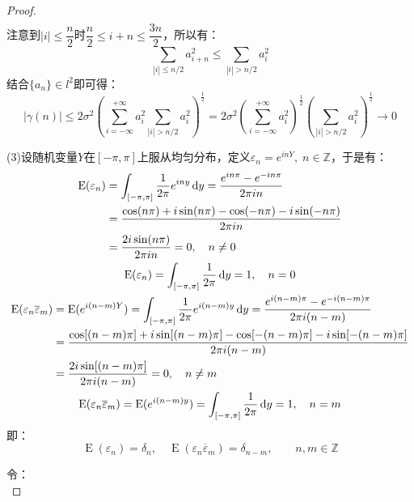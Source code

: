 \begin{proof}
\begin{align*}
	\end{align*}
	注意到$|i|\leqslant\dfrac{n}{2}$时$\dfrac{n}{2}\leqslant i+n\leqslant\dfrac{3n}{2}$，所以有：
	\begin{equation*}
		\sum_{|i|\leqslant n/2}a_{i+n}^2\leqslant\sum_{|i|>n/2}a_{i}^2
	\end{equation*}
	结合$\{a_n\}\in l^2$即可得：
	\begin{equation*}
		|\gamma(n)|\leqslant2\sigma^2\left(\sum_{i=-\infty}^{+\infty}a_i^2\sum_{|i|>n/2}a_{i}^2\right)^\frac{1}{2}=2\sigma^2\left(\sum_{i=-\infty}^{+\infty}a_i^2\right)^{\frac{1}{2}}\left(\sum_{|i|>n/2}a_{i}^2\right)^{\frac{1}{2}}\to0
	\end{equation*}\par
	(3)设随机变量$Y$在$[-\pi,\pi]$上服从均匀分布，定义$\varepsilon_n=e^{inY},\;n\in\mathbb{Z}$，于是有：
	\begin{gather*}
		\begin{aligned}
			\operatorname{E}(\varepsilon_n)&=\int_{[-\pi,\pi]}\frac{1}{2\pi}e^{iny}\mathop{}\!\mathrm{d} y=\frac{e^{in\pi}-e^{-in\pi}}{2\pi in} \\
			&=\frac{\cos(n\pi)+i\sin(n\pi)-\cos(-n\pi)-i\sin(-n\pi)}{2\pi in} \\
			&=\frac{2i\sin(n\pi)}{2\pi in}=0,\quad n\ne0
		\end{aligned} \\
		\operatorname{E}(\varepsilon_n)=\int_{[-\pi,\pi]}\frac{1}{2\pi}\mathop{}\!\mathrm{d} y=1,\quad n=0 \\
		\begin{aligned}
			\operatorname{E}(\varepsilon_n\overline{\varepsilon}_m)&=\operatorname{E}(e^{i(n-m)Y})=\int_{[-\pi,\pi]}\frac{1}{2\pi}e^{i(n-m)y}\mathop{}\!\mathrm{d} y=\frac{e^{i(n-m)\pi}-e^{-i(n-m)\pi}}{2\pi i(n-m)} \\
			&=\frac{\cos[(n-m)\pi]+i\sin[(n-m)\pi]-\cos[-(n-m)\pi]-i\sin[-(n-m)\pi]}{2\pi i(n-m)} \\
			&=\frac{2i\sin[(n-m)\pi]}{2\pi i(n-m)}=0,\quad n\ne m
		\end{aligned} \\
		\operatorname{E}(\varepsilon_n\overline{\varepsilon}_m)=\operatorname{E}(e^{i(n-m)y})=\int_{[-\pi,\pi]}\frac{1}{2\pi}\mathop{}\!\mathrm{d} y=1,\quad n=m
	\end{gather*}
	即：
	\begin{equation*}
		\operatorname{E}(\varepsilon_n)=\delta_n,\quad\operatorname{E}(\varepsilon_n\overline{\varepsilon}_m)=\delta_{n-m},\qquad n,m\in\mathbb{Z}
	\end{equation*}\par
	令：
	\begin{equation*}

\end{equation*}
\end{proof}
